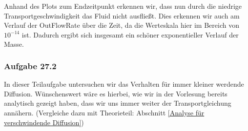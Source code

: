 \begin{figure}[H]
\end{figure}
Anhand des Plots zum Endzeitpunkt erkennen wir, dass nun durch die niedrige Transportgeschwindigkeit das Fluid nicht ausfließt.
Dies erkennen wir auch am Verlauf der OutFlowRate über die Zeit, da die Werteskala hier im Bereich von $10^{-14}$ ist. Dadurch ergibt sich insgesamt ein schöner exponentieller Verlauf der Masse.
\subsubsection{Aufgabe 27.2}
In dieser Teilaufgabe untersuchen wir das Verhalten für immer kleiner werdende Diffusion. Wünschenswert wäre es hierbei, wie wir in der Vorlesung bereits analytisch gezeigt haben, dass wir uns immer weiter der Transportgleichung annähern. (Vergleiche dazu mit Theorieteil: Abschnitt \ref{Analyse für verschwindende Diffusion})

\begin{figure}[H]
	\centering
\end{figure}

